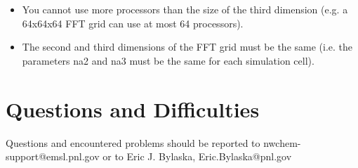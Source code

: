 \begin{itemize}
\item You cannot use more processors than the size of the third dimension 
  (e.g. a 64x64x64 FFT grid can use at most 64 processors).
\item The second and third dimensions of the FFT grid must be the same 
  (i.e. the parameters na2 and na3 must be the same for each simulation cell).
\end{itemize}


\section{Questions and Difficulties}

Questions and encountered problems should be reported to 
nwchem-support@emsl.pnl.gov 
or to Eric J. Bylaska, Eric.Bylaska@pnl.gov




